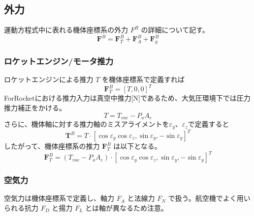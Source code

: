 ﻿\documentclass[a4paper]{jsarticle}
\begin{document}
\subsection{外力}
運動方程式中に表れる機体座標系の外力 $F^B$ の詳細について記す。
\begin{equation}
\bm{F}^B = \bm{F}^B_T + \bm{F}^B_A + \bm{F}^B_g
\end{equation}

\subsubsection{ロケットエンジン/モータ推力}
ロケットエンジンによる推力 $T$ を機体座標系で定義すれば
\begin{equation}
\bm{F}^B_T = [T, 0, 0]^T
\end{equation}
ForRocketにおける推力入力は真空中推力[N]であるため、大気圧環境下では圧力推力補正をかける。
\begin{equation}
T = T_{vac} - P_a A_e
\end{equation}
さらに、機体軸に対する推力軸のミスアライメントを$\varepsilon_y$、$\varepsilon_z$で定義すると
\begin{equation}
\bm{T}^B = T \cdot [\cos{\varepsilon_y} \cos{\varepsilon_z}, \sin{\varepsilon_y}, -\sin{\varepsilon_y}]^T
\end{equation}
したがって、機体座標系の推力 $\bm{F}^B_T$ は以下となる。
\begin{equation}
\bm{F}^B_T = (T_{vac} - P_aA_e) \cdot [\cos{\varepsilon_y} \cos{\varepsilon_z}, \sin{\varepsilon_y}, -\sin{\varepsilon_y}]^T
\end{equation}

\subsubsection{空気力}
空気力は機体座標系で定義し、軸力 $F_A$ と法線力 $F_N$ で扱う。航空機でよく用いられる抗力 $F_D$ と揚力 $F_L$ とは軸が異なるため注意。
\end{document}
